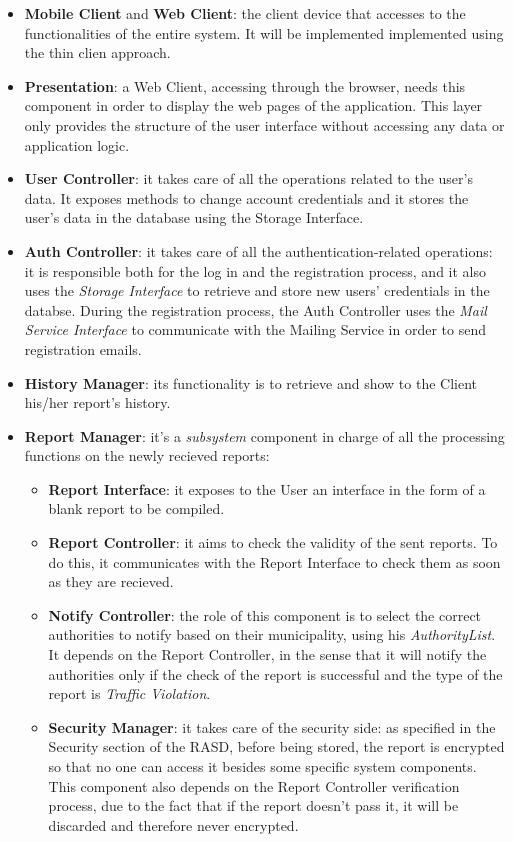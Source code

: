 \documentclass{report}
\begin{document}
\begin{itemize}
\item \textbf{Mobile Client} and \textbf{Web Client}: the client device that accesses to the functionalities of the entire system. It will be implemented implemented using the thin clien approach.
\item \textbf{Presentation}: a Web Client, accessing through the browser, needs this component in order to display the web pages of the application. This layer only provides the structure of the user interface without accessing any data or application logic.
\item \textbf{User Controller}: it takes care of all the operations related to the user's data. It exposes methods to change account credentials and it stores the user's data in the database using the Storage Interface.
\item \textbf{Auth Controller}: it takes care of all the authentication-related operations: it is responsible both for the log in and the registration process, and it also uses the \textit{Storage Interface} to retrieve and store new users' credentials in the databse. During the registration process, the Auth Controller uses the \textit{Mail Service Interface} to communicate with the Mailing Service in order to send registration emails.
\item \textbf{History Manager}: its functionality is to retrieve and show to the Client his/her report's history.
\item \textbf{Report Manager}: it's a \textit{subsystem} component in charge of all the processing functions on the newly recieved reports:
\begin{itemize}
    \item \textbf{Report Interface}: it exposes to the User an interface in the form of a blank report to be compiled.
    \item \textbf{Report Controller}: it aims to check the validity of the sent reports. To do this, it communicates with the Report Interface to check them as soon as they are recieved.
    \item \textbf{Notify Controller}: the role of this component is to select the correct authorities to notify based on their municipality, using his \textit{AuthorityList}. It depends on the Report Controller, in the sense that it will notify the authorities only if the check of the report is successful and the type of the report is \textit{Traffic Violation}.
    \item \textbf{Security Manager}: it takes care of the security side: as specified in the Security section of the RASD, before being stored, the report is encrypted so that no one can access it besides some specific system components. This component also depends on the Report Controller verification process, due to the fact that if the report doesn't pass it, it will be discarded and therefore never encrypted.

\end{itemize}
\end{itemize}
\end{document}
